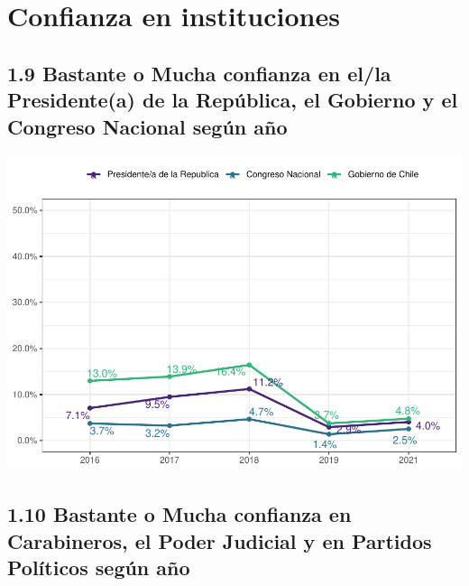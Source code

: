 \documentclass[
  12pt,
  openany]{book}
\begin{document}
\hypertarget{confianza-en-instituciones}{%
\section{Confianza en instituciones}\label{confianza-en-instituciones}}

\hypertarget{bastante-o-mucha-confianza-en-ella-presidentea-de-la-repuxfablica-el-gobierno-y-el-congreso-nacional-seguxfan-auxf1o}{%
\subsection{1.9 Bastante o Mucha confianza en el/la Presidente(a) de la República, el Gobierno y el Congreso Nacional según año}\label{bastante-o-mucha-confianza-en-ella-presidentea-de-la-repuxfablica-el-gobierno-y-el-congreso-nacional-seguxfan-auxf1o}}

\includegraphics{reporte-elsoc_files/figure-latex/unnamed-chunk-14-1.pdf}

\hypertarget{bastante-o-mucha-confianza-en-carabineros-el-poder-judicial-y-en-partidos-poluxedticos-seguxfan-auxf1o}{%
\subsection{1.10 Bastante o Mucha confianza en Carabineros, el Poder Judicial y en Partidos Políticos según año}\label{bastante-o-mucha-confianza-en-carabineros-el-poder-judicial-y-en-partidos-poluxedticos-seguxfan-auxf1o}}
\end{document}
